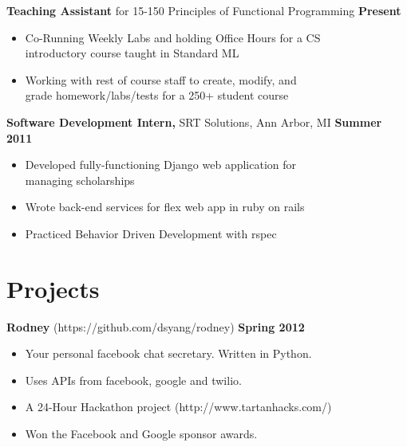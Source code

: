 \documentclass[sectioned]{dsyangres}
\begin{document}
\begin{resume}
\textbf{Teaching Assistant} for 15-150 Principles of Functional
 Programming \hfill \textbf{Present}
 \begin{itemize} \itemsep -2pt
   \item Co-Running Weekly Labs and holding Office Hours for a CS\\
     introductory course taught in Standard ML
   \item Working with rest of course staff to create, modify, and\\
     grade homework/labs/tests for a 250+ student course
 \end{itemize}

\textbf{Software Development Intern,}
  SRT Solutions, Ann Arbor, MI \hfill \textbf{Summer 2011}
  \begin{itemize} \itemsep -2pt
    \item Developed fully-functioning Django web application for\\
      managing scholarships
    \item Wrote back-end services for flex web app in ruby
      on rails
    \item Practiced Behavior Driven Development with rspec
  \end{itemize}



\section{Projects}

\textbf{Rodney} (https://github.com/dsyang/rodney)
\hfill \textbf{Spring 2012}
  \begin{itemize} \itemsep -2pt
    \item Your personal facebook chat secretary. Written in Python.
    \item Uses APIs from facebook, google and twilio.
    \item A 24-Hour Hackathon project (http://www.tartanhacks.com/)
    \item Won the Facebook and Google sponsor awards.
  \end{itemize}


\end{resume}
\end{document}

